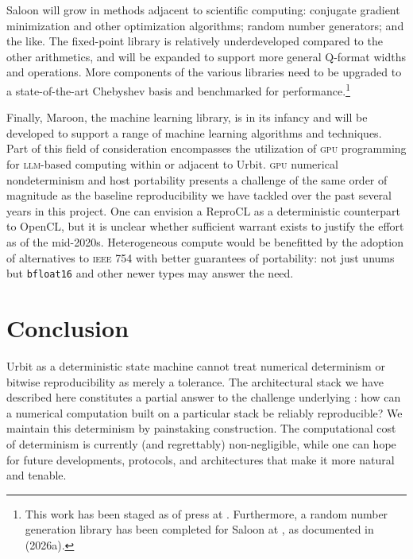 \documentclass[twoside]{article}
\begin{document}
Saloon will grow in methods adjacent to scientific computing:  conjugate gradient minimization and other optimization algorithms; random number generators; and the like.  The fixed-point library is relatively under\-developed compared to the other arithmetics, and will be expanded to support more general Q-format widths and operations.  More components of the various libraries need to be upgraded to a state-of-the-art Chebyshev basis and benchmarked for performance.\footnote{This work has been staged as of press at .  Furthermore, a random number generation library has been completed for Saloon at , as documented in  (2026a).\nocite{Davis2026}}

Finally, Maroon, the machine learning library, is in its infancy and will be developed to support a range of machine learning algorithms and techniques.  Part of this field of consideration encompasses the utilization of \textsc{gpu} programming for \textsc{llm}-based computing within or adjacent to Urbit.  \textsc{gpu} numerical nondeterminism and host portability presents a challenge of the same order of magnitude as the baseline reproducibility we have tackled over the past several years in this project.  One can envision a ReproCL as a deterministic counterpart to OpenCL, but it is unclear whether sufficient warrant exists to justify the effort as of the mid-2020s.  Heterogeneous compute would be benefitted by the adoption of alternatives to \textsc{ieee} 754 with better guarantees of portability:  not just unums but \texttt{bfloat16} and other newer types may answer the need.

\section{Conclusion}

Urbit as a deterministic state machine cannot treat numerical determinism or bitwise reproducibility as merely a tolerance.  The architectural stack we have described here constitutes a partial answer to the challenge underlying \citet{Davis2024}:  how can a numerical computation built on a particular stack be reliably reproducible?  We maintain this determinism by painstaking construction.  The computational cost of determinism is currently (and regrettably) non-negligible, while one can hope for future developments, protocols, and architectures that make it more natural and tenable.\tombstone

\printbibliography
\end{document}
